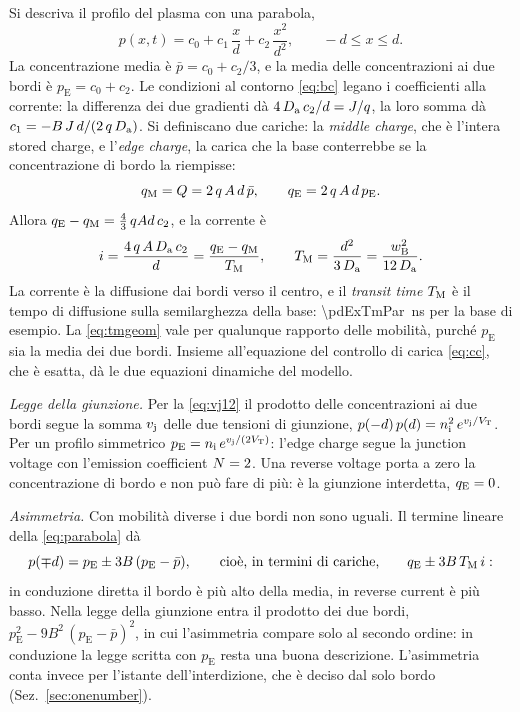 \documentclass[10pt,a4paper]{scrartcl}
\let\newcommand\pdvaluedefine
\newcommand{\TM}{T_\mathrm{M}}
\newcommand{\qE}{q_\mathrm{E}}
\newcommand{\qM}{q_\mathrm{M}}
\newcommand{\vj}{v_\mathrm{j}}
\newcommand{\VT}{V_\mathrm{T}}
\newcommand{\Nem}{N}                          %
\newcommand{\nint}{n_\mathrm{i}}
\newcommand{\wB}{w_\mathrm{B}}
\newcommand{\Da}{D_\mathrm{a}}
\newcommand{\Pp}{p\textsuperscript{+}}
\begin{document}
Si descriva il profilo del plasma con una parabola,
\begin{equation}
p(x,t) = c_0 + c_1\,\frac{x}{d} + c_2\,\frac{x^2}{d^2} , \qquad -d \leq x \leq d .
\label{eq:parabola}
\end{equation}
La concentrazione media è $\bar p = c_0 + c_2/3$, e la media delle concentrazioni ai due bordi è $p_\mathrm{E} = c_0 + c_2$. Le condizioni al contorno \eqref{eq:bc} legano i coefficienti alla corrente: la differenza dei due gradienti dà $4\,\Da\,c_2/d = J/q$, la loro somma dà $c_1 = -B\,J\,d/(2\,q\,\Da)$. Si definiscano due cariche: la \emph{middle charge}, che è l'intera stored charge, e l'\emph{edge charge}, la carica che la base conterrebbe se la concentrazione di bordo la riempisse:
\begin{equation}
\qM = Q = 2\,q\,A\,d\,\bar p , \qquad \qE = 2\,q\,A\,d\,p_\mathrm{E} .
\label{eq:lumpeddef}
\end{equation}
Allora $\qE - \qM = \tfrac43\,qAd\,c_2$, e la corrente è
\begin{equation}
i = \frac{4\,q\,A\,\Da\,c_2}{d} = \frac{\qE - \qM}{\TM} , \qquad \TM = \frac{d^2}{3\,\Da} = \frac{\wB^2}{12\,\Da} .
\label{eq:tmgeom}
\end{equation}
La corrente è la diffusione dai bordi verso il centro, e il \emph{transit time} $\TM$ è il tempo di diffusione sulla semilarghezza della base: \SI{\pdExTmPar}{\nano\second} per la base di esempio. La \eqref{eq:tmgeom} vale per qualunque rapporto delle mobilità, purché $p_\mathrm{E}$ sia la media dei due bordi. Insieme all'equazione del controllo di carica \eqref{eq:cc}, che è esatta, dà le due equazioni dinamiche del modello.

\emph{Legge della giunzione.} Per la \eqref{eq:vj12} il prodotto delle concentrazioni ai due bordi segue la somma $\vj$ delle due tensioni di giunzione, $p(-d)\,p(d) = \nint^2\,e^{\vj/\VT}$. Per un profilo simmetrico $p_\mathrm{E} = \nint\,e^{\vj/(2\VT)}$: l'edge charge segue la junction voltage con l'emission coefficient $\Nem = 2$. Una reverse voltage porta a zero la concentrazione di bordo e non può fare di più: è la giunzione interdetta, $\qE = 0$.

\emph{Asimmetria.} Con mobilità diverse i due bordi non sono uguali. Il termine lineare della \eqref{eq:parabola} dà
\begin{equation}
p(\mp d) = p_\mathrm{E} \pm 3B\,(p_\mathrm{E} - \bar p) , \qquad \text{cioè, in termini di cariche,} \qquad \qE \pm 3B\,\TM\,i :
\label{eq:edgesasym}
\end{equation}
in conduzione diretta il bordo \Pp{} è più alto della media, in reverse current è più basso. Nella legge della giunzione entra il prodotto dei due bordi, $p_\mathrm{E}^2 - 9B^2\,(p_\mathrm{E}-\bar p)^2$, in cui l'asimmetria compare solo al secondo ordine: in conduzione la legge scritta con $p_\mathrm{E}$ resta una buona descrizione. L'asimmetria conta invece per l'istante dell'interdizione, che è deciso dal solo bordo \Pp{} (Sez.~\ref{sec:onenumber}).
\end{document}
